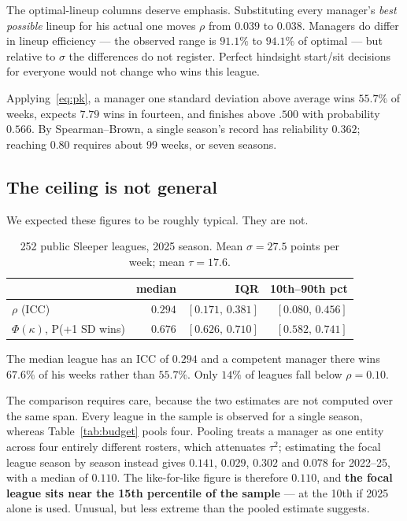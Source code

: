 \documentclass[11pt]{article}
\begin{document}
The optimal-lineup columns deserve emphasis. Substituting every manager's
\emph{best possible} lineup for his actual one moves $\rho$ from $0.039$ to
$0.038$. Managers do differ in lineup efficiency --- the observed range is
$91.1\%$ to $94.1\%$ of optimal --- but relative to $\sigma$ the differences do
not register. Perfect hindsight start/sit decisions for everyone would not
change who wins this league.

Applying~\eqref{eq:pk}, a manager one standard deviation above average wins
$55.7\%$ of weeks, expects $7.79$ wins in fourteen, and finishes above $.500$
with probability $0.566$. By Spearman--Brown, a single season's record has
reliability $0.362$; reaching $0.80$ requires about 99 weeks, or seven seasons.

\subsection{The ceiling is not general}\label{sec:many}

We expected these figures to be roughly typical. They are not.

\begin{table}[h]
\centering\small
\begin{tabular}{lrrr}
\toprule
& median & IQR & 10th--90th pct \\
\midrule
$\rho$ (ICC)                 & $0.294$ & $[0.171,\,0.381]$ & $[0.080,\,0.456]$ \\
$\Phi(\kappa)$, P(+1 SD wins) & $0.676$ & $[0.626,\,0.710]$ & $[0.582,\,0.741]$ \\
\bottomrule
\end{tabular}
\caption{252 public Sleeper leagues, 2025 season. Mean $\sigma = 27.5$ points
per week; mean $\tau = 17.6$.}
\label{tab:many}
\end{table}

The median league has an ICC of $0.294$ and a competent manager there wins
$67.6\%$ of his weeks rather than $55.7\%$. Only $14\%$ of leagues fall below
$\rho = 0.10$.

The comparison requires care, because the two estimates are not computed over the
same span. Every league in the sample is observed for a single season, whereas
Table~\ref{tab:budget} pools four. Pooling treats a manager as one entity across
four entirely different rosters, which attenuates $\tau^2$; estimating the focal
league season by season instead gives $0.141$, $0.029$, $0.302$ and $0.078$ for
2022--25, with a median of $0.110$. The like-for-like figure is therefore
$0.110$, and \textbf{the focal league sits near the 15th percentile of the
sample} --- at the 10th if 2025 alone is used. Unusual, but less extreme than the
pooled estimate suggests.
\end{document}
